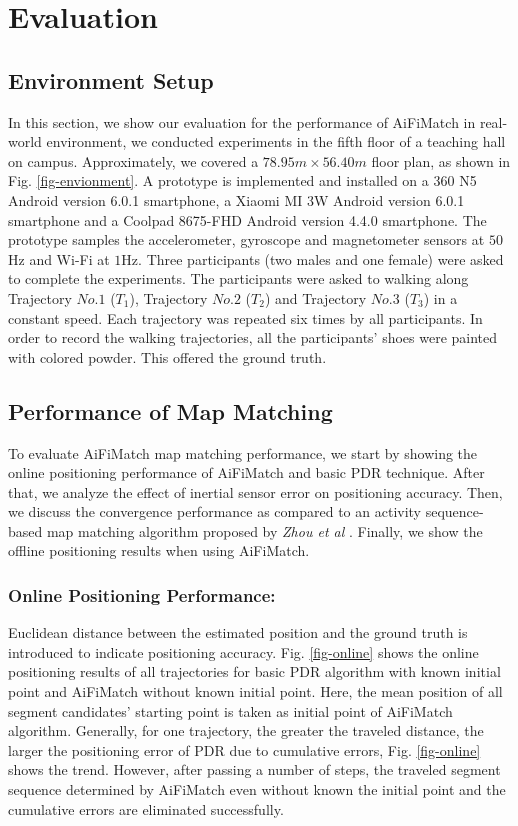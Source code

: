 \documentclass{llncs}
\begin{document}
\section{Evaluation}

\subsection{Environment Setup}

In this section, we show our evaluation for the performance of AiFiMatch in real-world environment, we conducted experiments in the fifth floor of a teaching hall on campus. Approximately, we covered a $78.95m \times 56.40m$ floor plan, as shown in Fig. \ref{fig-envionment}. A prototype is implemented and installed on a 360 N5 Android version 6.0.1 smartphone, a Xiaomi MI 3W Android version 6.0.1 smartphone and a Coolpad 8675-FHD Android version 4.4.0 smartphone. The prototype samples the accelerometer, gyroscope and magnetometer sensors at $50$Hz and Wi-Fi at $1$Hz. Three participants (two males and one female) were asked to complete the experiments. The participants were asked to walking along Trajectory $No.1$ ($T_1$), Trajectory $No.2$ ($T_2$) and Trajectory $No.3$ ($T_3$) in a constant speed. Each trajectory was repeated six times by all participants. In order to record the walking trajectories, all the participants' shoes were painted with colored powder. This offered the ground truth.

\subsection{Performance of Map Matching}

To evaluate AiFiMatch map matching performance, we start by showing the online positioning performance of AiFiMatch and basic PDR technique. After that, we analyze the effect of inertial sensor error on positioning accuracy. Then, we discuss the convergence performance as compared to an activity sequence-based map matching algorithm proposed by \emph{Zhou et al} \cite{zhou2015activity}. Finally, we show the offline positioning results when using AiFiMatch.

\subsubsection{Online Positioning Performance:}

Euclidean distance between the estimated position and the ground truth is introduced to indicate positioning accuracy.  Fig. \ref{fig-online} shows the online positioning results of all trajectories for basic PDR algorithm with known initial point and AiFiMatch without known initial point.  Here, the mean position of all segment candidates' starting point is taken as initial point of AiFiMatch algorithm. Generally, for one trajectory, the greater the traveled distance, the larger the positioning error of PDR due to cumulative errors, Fig. \ref{fig-online} shows the trend.  However, after passing a number of steps, the traveled segment sequence determined by AiFiMatch even without known the initial point and the cumulative  errors are eliminated successfully.
\end{document}
